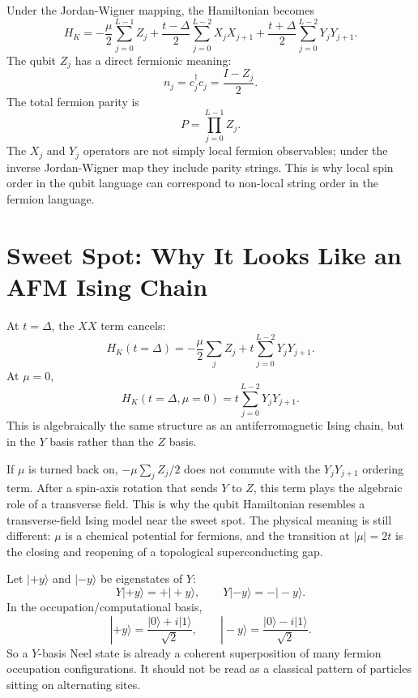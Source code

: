 \documentclass[11pt]{article}
\newcommand{\ket}[1]{|#1\rangle}
\begin{document}
Under the Jordan-Wigner mapping, the Hamiltonian becomes
\begin{equation}
  H_K
  =
  -\frac{\mu}{2}\sum_{j=0}^{L-1}Z_j
  +\frac{t-\Delta}{2}\sum_{j=0}^{L-2}X_jX_{j+1}
  +\frac{t+\Delta}{2}\sum_{j=0}^{L-2}Y_jY_{j+1}.
  \label{eq:kitaev-qubit}
\end{equation}
The qubit $Z_j$ has a direct fermionic meaning:
\begin{equation}
  n_j=c_j^\dagger c_j=\frac{I-Z_j}{2}.
\end{equation}
The total fermion parity is
\begin{equation}
  P=\prod_{j=0}^{L-1}Z_j.
\end{equation}
The $X_j$ and $Y_j$ operators are not simply local fermion observables; under
the inverse Jordan-Wigner map they include parity strings. This is why local
spin order in the qubit language can correspond to non-local string order in
the fermion language.

\section{Sweet Spot: Why It Looks Like an AFM Ising Chain}

At $t=\Delta$, the $XX$ term cancels:
\begin{equation}
  H_K(t=\Delta)
  =
  -\frac{\mu}{2}\sum_j Z_j
  +t\sum_{j=0}^{L-2}Y_jY_{j+1}.
\end{equation}
At $\mu=0$,
\begin{equation}
  H_K(t=\Delta,\mu=0)
  =
  t\sum_{j=0}^{L-2}Y_jY_{j+1}.
  \label{eq:pure-yy}
\end{equation}
This is algebraically the same structure as an antiferromagnetic Ising chain,
but in the $Y$ basis rather than the $Z$ basis.

If $\mu$ is turned back on, $-\mu\sum_jZ_j/2$ does not commute with the
$Y_jY_{j+1}$ ordering term. After a spin-axis rotation that sends $Y$ to $Z$,
this term plays the algebraic role of a transverse field. This is why the
qubit Hamiltonian resembles a transverse-field Ising model near the sweet spot.
The physical meaning is still different: $\mu$ is a chemical potential for
fermions, and the transition at $|\mu|=2t$ is the closing and reopening of a
topological superconducting gap.

Let $\ket{+y}$ and $\ket{-y}$ be eigenstates of $Y$:
\begin{equation}
  Y\ket{+y}=+\ket{+y},
  \qquad
  Y\ket{-y}=-\ket{-y}.
\end{equation}
In the occupation/computational basis,
\begin{equation}
  \ket{+y}=\frac{\ket{0}+i\ket{1}}{\sqrt{2}},
  \qquad
  \ket{-y}=\frac{\ket{0}-i\ket{1}}{\sqrt{2}}.
\end{equation}
So a $Y$-basis Neel state is already a coherent superposition of many fermion
occupation configurations. It should not be read as a classical pattern of
particles sitting on alternating sites.
\end{document}

